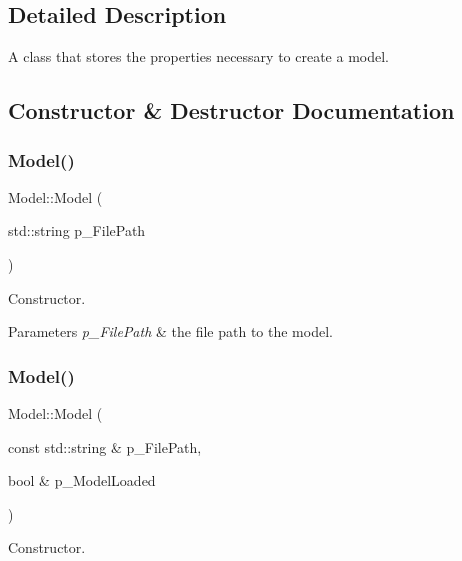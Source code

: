\subsection{Detailed Description}
A class that stores the properties necessary to create a model. 

\subsection{Constructor \& Destructor Documentation}
\mbox{\label{class_model_a1803bcfb4df005e3fc0e4cc9803e862c}} 
\subsubsection{\texorpdfstring{Model()}{Model()}\hspace{0.1cm}{\footnotesize\ttfamily [1/2]}}
{\footnotesize\ttfamily Model\+::\+Model (\begin{DoxyParamCaption}\item[{std\+::string}]{p\+\_\+\+File\+Path }\end{DoxyParamCaption})}



Constructor. 


\begin{DoxyParams}{Parameters}
{\em p\+\_\+\+File\+Path} & the file path to the model. \\
\hline
\end{DoxyParams}
\mbox{\label{class_model_a27483109877a1835b5932074a78edb95}} 
\subsubsection{\texorpdfstring{Model()}{Model()}\hspace{0.1cm}{\footnotesize\ttfamily [2/2]}}
{\footnotesize\ttfamily Model\+::\+Model (\begin{DoxyParamCaption}\item[{const std\+::string \&}]{p\+\_\+\+File\+Path,  }\item[{bool \&}]{p\+\_\+\+Model\+Loaded }\end{DoxyParamCaption})}



Constructor. 


